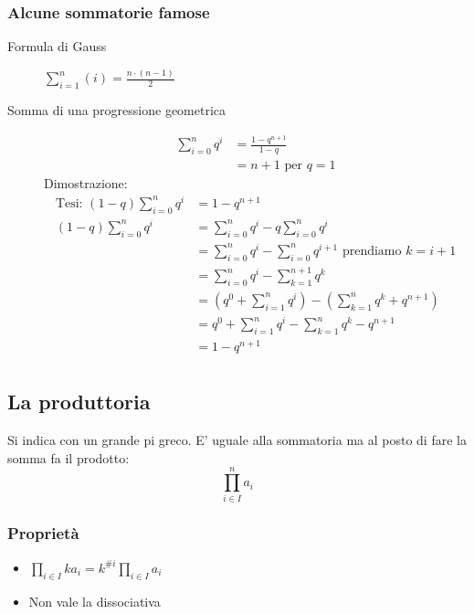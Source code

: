\subsubsection{Alcune sommatorie famose}
\begin{description}
    \item[Formula di Gauss] $\sum_{i=1}^n (i) = \frac{n\cdot(n-1)}{2}$
    \item[Somma di una progressione geometrica]
        \begin{align*}
            \sum_{i = 0}^n q^i &= \frac{1-q^{n+1}}{1-q} \\
            &= n+1 \text{ per } q = 1
        \end{align*}
        Dimostrazione:
        \begin{align*}
            \text{Tesi: } (1-q)\sum_{i = 0}^n q^i &= 1-q^{n+1} \\
            (1-q)\sum_{i = 0}^n q^i &= \sum_{i = 0}^n q^i - q \sum_{i = 0}^n q^i \\
            &= \sum_{i = 0}^n q^i - \sum_{i = 0}^n q^{i+1} \text{ prendiamo } k = i + 1 \\
            &= \sum_{i = 0}^n q^i - \sum_{k = 1}^{n+1} q^{k} \\
            &= (q^0 + \sum_{i = 1}^n q^i) - (\sum_{k = 1}^{n} q^{k} + q^{n+1}) \\
            &= q^0 + \sum_{i = 1}^n q^i - \sum_{k = 1}^{n} q^{k} - q^{n+1} \\
            &= 1 - q^{n+1} \\
        \end{align*}
\end{description}

\subsection{La produttoria}
Si indica con un grande pi greco. E' uguale alla sommatoria ma al posto di
fare la somma fa il prodotto:
\[ \prod_{i \in I}^n a_i \]

\subsubsection{Proprietà}
\begin{itemize}
    \item $\prod_{i \in I} ka_i = k^{\#i}\prod_{i \in I} a_i$
    \item Non vale la dissociativa
\end{itemize} 
